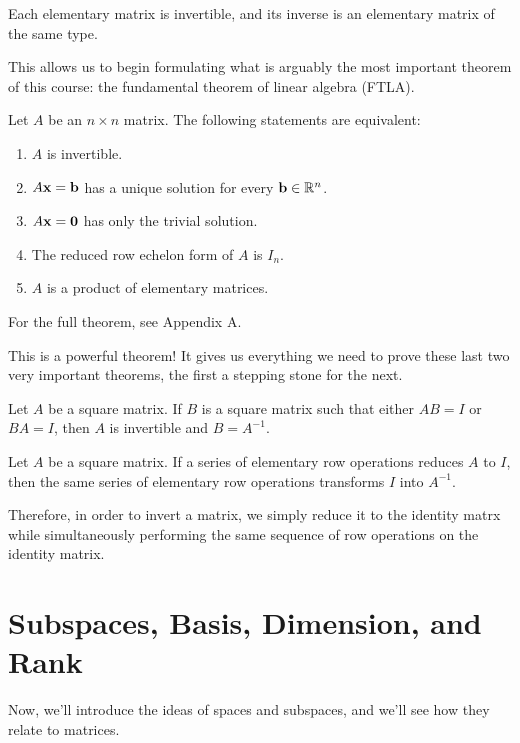 \documentclass[../m73main.tex]{chapters}
\begin{document}
\begin{theorem}
	Each elementary matrix is invertible, and its inverse is an elementary matrix of the same type.
\end{theorem}

This allows us to begin formulating what is arguably the most important theorem of this course: the fundamental theorem of linear algebra (FTLA).

\begin{theorem}
	Let $A$ be an $n\times n$ matrix.
	The following statements are equivalent:
	\begin{enumerate}[label=(\alph*)]
		\item $A$ is invertible.
		\item $A\mathbf{x}= \mathbf{b}$ has a unique solution for every $\mathbf{b}\in\mathbb{R}^n$.
		\item $A\mathbf{x}=\mathbf{0}$ has only the trivial solution.
		\item The reduced row echelon form of $A$ is $I_n$.
		\item $A$ is a product of elementary matrices.
	\end{enumerate}
	For the full theorem, see Appendix A.
\end{theorem}

This is a powerful theorem!
It gives us everything we need to prove these last two very important theorems, the first a stepping stone for the next.

\begin{theorem}
	Let $A$ be a square matrix.
	If $B$ is a square matrix such that either $AB = I$ or $BA = I$, then $A$ is invertible and $B = A^{-1}$.
\end{theorem}

\begin{theorem}
	Let $A$ be a square matrix.
	If a series of elementary row operations reduces $A$ to $I$, then the same series of elementary row operations transforms $I$ into $A^{-1}$.
\end{theorem}

Therefore, in order to invert a matrix, we simply reduce it to the identity matrx while simultaneously performing the same sequence of row operations on the identity matrix.

\section{Subspaces, Basis, Dimension, and Rank}
Now, we'll introduce the ideas of spaces and subspaces, and we'll see how they relate to matrices.
\end{document}
